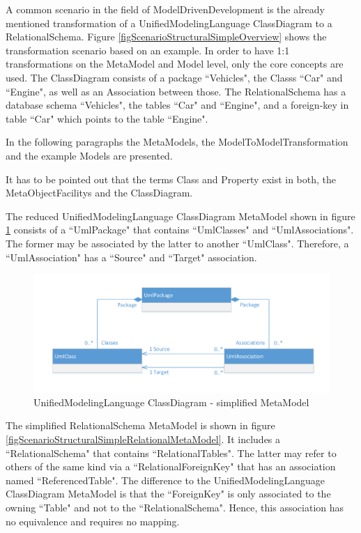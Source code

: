 A common scenario in the field of \gls{ModelDrivenDevelopment} is the already mentioned transformation of a \gls{UnifiedModelingLanguage} \gls{ClassDiagram} to a \gls{RelationalSchema}. Figure \ref{figScenarioStructuralSimpleOverview} shows the transformation scenario based on an example. In order to have 1:1 transformations on the \gls{MetaModel} and \gls{Model} level, only the core concepts are used. The \gls{ClassDiagram} consists of a package ``Vehicles", the \glspl{Class} ``Car" and ``Engine", as well as an \gls{Association} between those. The \gls{RelationalSchema} has a database schema ``Vehicles", the tables ``Car" and ``Engine", and a foreign-key in table ``Car" which points to the table ``Engine".

In the following paragraphs the \glspl{MetaModel}, the \gls{ModelToModelTransformation} and the example \glspl{Model} are presented.

It has to be pointed out that the terms \gls{Class} and \gls{Property} exist in both, the \glspl{MetaObjectFacility} and the \gls{ClassDiagram}.

The reduced \gls{UnifiedModelingLanguage} \gls{ClassDiagram} \gls{MetaModel} shown in figure \ref{figScenarioStructuralSimpleUmlClassMetaModel} consists of a ``UmlPackage" that contains ``UmlClasses" and ``UmlAssociations". The former may be associated by the latter to another ``UmlClass". Therefore, a ``UmlAssociation" has a ``Source" and ``Target" association.

\begin{figure}[htb]
	\centering
	\includegraphics[scale=0.6, trim=0cm 1cm 0cm 1cm, clip=true]{Images/ScenarioStructuralSimpleUmlClassMetaModel.pdf} 
	\caption{\Gls{UnifiedModelingLanguage} \gls{ClassDiagram} - simplified \gls{MetaModel}}
	\label{figScenarioStructuralSimpleUmlClassMetaModel}
\end{figure}

The simplified \gls{RelationalSchema} \gls{MetaModel} is shown in figure \ref{figScenarioStructuralSimpleRelationalMetaModel}. It includes a ``RelationalSchema" that contains ``RelationalTables". The latter may refer to others of the same kind via a ``RelationalForeignKey" that has an association named ``ReferencedTable". The difference to the \gls{UnifiedModelingLanguage} \gls{ClassDiagram} \gls{MetaModel} is that the ``ForeignKey" is only associated to the owning ``Table" and not to the ``RelationalSchema". Hence, this association has no equivalence and requires no mapping.

